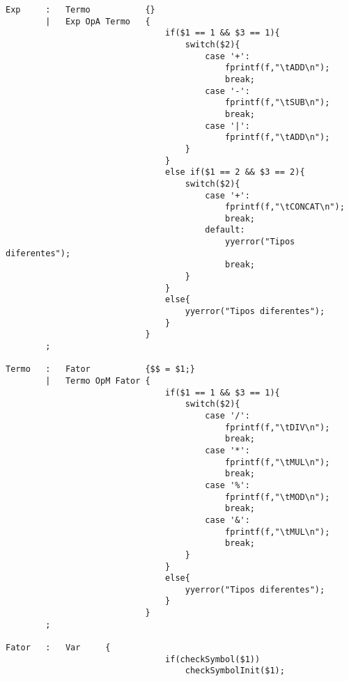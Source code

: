 \documentclass{report}
\begin{document}
\begin{verbatim}
Exp     :   Termo           {}
        |   Exp OpA Termo   {
                                if($1 == 1 && $3 == 1){
                                    switch($2){
                                        case '+': 
                                            fprintf(f,"\tADD\n");
                                            break;
                                        case '-': 
                                            fprintf(f,"\tSUB\n");
                                            break;
                                        case '|':
                                            fprintf(f,"\tADD\n");
                                    }
                                }
                                else if($1 == 2 && $3 == 2){
                                    switch($2){
                                        case '+': 
                                            fprintf(f,"\tCONCAT\n");
                                            break;
                                        default:
                                            yyerror("Tipos diferentes");
                                            break;
                                    }
                                }
                                else{
                                    yyerror("Tipos diferentes");
                                }
                            }
        ;

Termo   :   Fator           {$$ = $1;}
        |   Termo OpM Fator {
                                if($1 == 1 && $3 == 1){
                                    switch($2){
                                        case '/': 
                                            fprintf(f,"\tDIV\n");
                                            break;
                                        case '*': 
                                            fprintf(f,"\tMUL\n");
                                            break;
                                        case '%': 
                                            fprintf(f,"\tMOD\n");
                                            break;
                                        case '&':
                                            fprintf(f,"\tMUL\n");
                                            break;
                                    }
                                }
                                else{
                                    yyerror("Tipos diferentes");
                                }
                            }
        ;

Fator   :   Var     {
                                if(checkSymbol($1))
                                    checkSymbolInit($1);


\end{verbatim}
\end{document}
